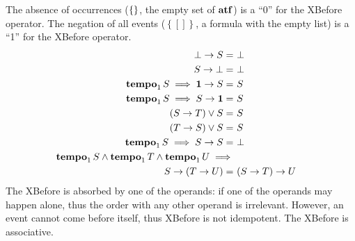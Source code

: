 \documentclass[12pt,openright,twoside,a4paper,oldfontcommands,english,brazil,final]{abntex2}
\theoremstyle{theo}
\def\xbeforeop{\ensuremath\rightarrow}
\newcommand{\xbefore}[2]{\ensuremath #1 \xbeforeop #2 }
\def\tempoop{\ensuremath\operatorname{\mathbf{tempo}}}
\newcommand{\tempo}[2][1-4]{\ensuremath\tempoop_{#1} #2}
\def\False{\ensuremath\operatorname{\left\{\right\}}}
\def\algebraset{\ensuremath\mathbf{atf}}
\def\neutral{\ensuremath\mathrm{\mathbf{1}}}
\begin{document}
The absence of occurrences ($\False$, the empty set of $\algebraset$) is a ``0'' for the \ac{XBefore} operator.
The negation of all events ($\left\{\left[\right]\right\}$, a formula with the empty list) is a ``1'' for the \ac{XBefore} operator.
%
\begin{subequations}
\begin{align}
\xbefore{\bot}{S} =&~
  \bot &
  \label{thm:xbefore-of-false-1}\\
%
\xbefore{S}{\bot} =&~
  \bot &
  \label{thm:xbefore-of-false-2}\\
%
\tempo[1]{S} \implies \xbefore{\neutral}{S} =&~
  S &
  \label{thm:xbefore_neutral_1}\\
%
\tempo[1]{S} \implies \xbefore{S}{\neutral} =&~
  S &
  \label{thm:xbefore_neutral_2}\\
%
\left(\xbefore{S}{T}\right) \lor S =&~ S &
  \label{thm:xbefore-sup-absorb-1}\\
%
\left(\xbefore{T}{S}\right) \lor S =&~ S &
  \label{thm:xbefore-sup-absorb-2}\\
%
\tempo[1]{S} \implies
  \xbefore{S}{S} =&~
  \bot &
  \label{thm:xbefore-not-idempotent}\\
%
\tempo[1]{S}\land\tempo[1]{T}\land \tempo[1]{U}\implies&\nonumber\\
  \xbefore{S}{(\xbefore{T}{U})} =&~
  \xbefore{(\xbefore{S}{T})}{U} &
  \label{thm:xbefore-associativity}
%
\end{align}
\end{subequations}
%
The \ac{XBefore} is absorbed by one of the operands: if one of the operands may happen alone, thus the order with any other operand is irrelevant.
However, an event cannot come before itself, thus \ac{XBefore} is not idempotent.
The \ac{XBefore} is associative.
\end{document}
